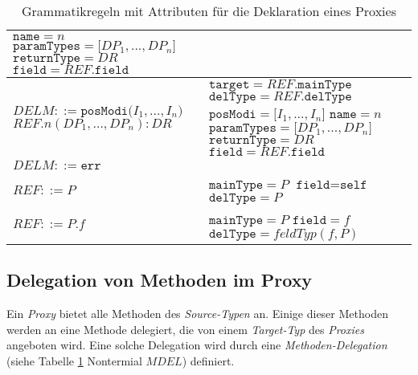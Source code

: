 \begin{table}[h!]
\begin{tabular}{|p{6cm}|p{10cm}|}
$\texttt{name} = \mathit{n}$\newline
$\texttt{paramTypes} = \mathit{[DP_1},...,\mathit{DP_n]}$\newline
$\texttt{returnType} = \mathit{DR}$\newline
$\texttt{field} = \mathit{REF}\texttt{.field}$
\\
\hline
$\mathit{DELM} ::=\texttt{posModi(} \mathit{I_1},...,\mathit{I_n} \texttt{)}$\newline
$\mathit{REF}\texttt{.}n(\mathit{DP_1},...,\mathit{DP_n}):DR $  
&
$\texttt{target} = \mathit{REF}.\texttt{mainType}$\newline
$\texttt{delType} = \mathit{REF}.\texttt{delType}$\newline
$\texttt{posModi} = \mathit{[I_1},...,\mathit{I_n]}$\newline
$\texttt{name} = \mathit{n}$\newline
$\texttt{paramTypes} = \mathit{[DP_1},...,\mathit{DP_n]}$\newline
$\texttt{returnType} = \mathit{DR}$\newline
$\texttt{field} = \mathit{REF}\texttt{.field}$
\\
\hline
$\mathit{DELM} ::= \texttt{err} $  
&
\\
\hline
$\mathit{REF} ::= \mathit{P}$
& 
$\texttt{mainType} = \mathit{P}$\newline
$\texttt{field} = \texttt{self}$\newline
$\texttt{delType} = \mathit{P}$
\\
\hline
$\mathit{REF} ::= \mathit{P}\texttt{.}\mathit{f}$
&
$\texttt{mainType} = \mathit{P}$\newline
$\texttt{field} = \mathit{f}$\newline
$\texttt{delType} = \mathit{feldTyp(f,P)}$
\\
\hline
\end{tabular}
\caption{Grammatikregeln mit Attributen für die Deklaration eines Proxies}
 \label{tab:attrGrProxies}
\end{table}
\noindent
\subsection{Delegation von Methoden im Proxy}
Ein \emph{Proxy} bietet alle Methoden des \emph{Source-Typen} an. Einige dieser Methoden werden an eine Methode delegiert, die von einem \emph{Target-Typ} des \emph{Proxies} angeboten wird. Eine solche Delegation wird durch eine \emph{Methoden-Delegation} (siehe Tabelle \ref{tab:attrGrProxies} Nontermial $\mathit{MDEL}$) definiert.
